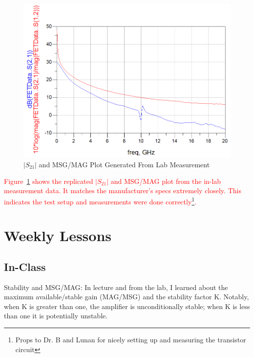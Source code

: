 \documentclass[conference]{IEEEtran}
\begin{document}
\begin{figure}[!h]
\centering
\includegraphics[scale=0.3]{pics/MSGPlot.png}
\caption{$|S_{21}|$ and MSG/MAG Plot Generated From Lab Measurement}
\label{fig:msgplot}
\end{figure}

\textcolor{red}{Figure~\ref{fig:msgplot} shows the replicated $|S_{21}|$ and MSG/MAG plot from the in-lab measurement data.  It matches the manufacturer's specs extremely closely.  This indicates the test setup and measurements were done correctly\footnote{Props to Dr. B and Lunan for nicely setting up and measuring the transistor circuit}.}

\section{Weekly Lessons}
\subsection{In-Class}
Stability and MSG/MAG: In lecture and from the lab, I learned about the maximum available/stable gain (MAG/MSG) and the stability factor K.  Notably, when K is greater than one, the amplifier is unconditionally stable; when K is less than one it is potentially unstable.
\end{document}
